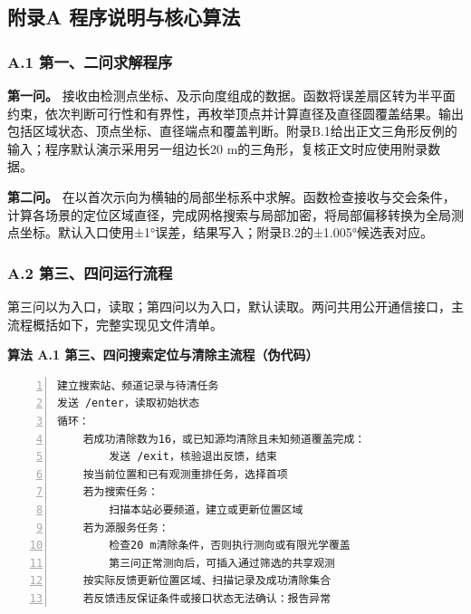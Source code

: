 \documentclass[UTF8,fontset=none,zihao=-4,a4paper]{ctexart}
\begin{document}
\clearpage
\setcounter{table}{0}
\renewcommand{\thetable}{A.\arabic{table}}
\renewcommand{\theHtable}{appendix.A.\arabic{table}}
\subsection{附录A 程序说明与核心算法}\label{appendix-A}

\subsubsection{A.1 第一、二问求解程序}\label{sec-A-1}

\textbf{第一问。} 接收由检测点坐标、及示向度组成的数据。函数将误差扇区转为半平面约束，依次判断可行性和有界性，再枚举顶点并计算直径及直径圆覆盖结果。输出包括区域状态、顶点坐标、直径端点和覆盖判断。附录B.1给出正文三角形反例的输入；程序默认演示采用另一组边长20 m的三角形，复核正文时应使用附录数据。

\textbf{第二问。} 在以首次示向为横轴的局部坐标系中求解。函数检查接收与交会条件，计算各场景的定位区域直径，完成网格搜索与局部加密，将局部偏移转换为全局测点坐标。默认入口使用±1°误差，结果写入；附录B.2的±1.005°候选表对应。

\subsubsection{A.2 第三、四问运行流程}\label{sec-A-2}

第三问以为入口，读取；第四问以为入口，默认读取。两问共用公开通信接口，主流程概括如下，完整实现见文件清单。

\textbf{算法 A.1 第三、四问搜索定位与清除主流程（伪代码）}

\begin{Verbatim}[fontsize=\small,numbers=left,numbersep=6pt,frame=lines,framesep=5pt,xleftmargin=1.5em]
建立搜索站、频道记录与待清任务
发送 /enter，读取初始状态
循环：
    若成功清除数为16，或已知源均清除且未知频道覆盖完成：
        发送 /exit，核验退出反馈，结束
    按当前位置和已有观测重排任务，选择首项
    若为搜索任务：
        扫描本站必要频道，建立或更新位置区域
    若为源服务任务：
        检查20 m清除条件，否则执行测向或有限光学覆盖
        第三问正常测向后，可插入通过筛选的共享观测
    按实际反馈更新位置区域、扫描记录及成功清除集合
    若反馈违反保证条件或接口状态无法确认：报告异常
\end{Verbatim}
\end{document}
